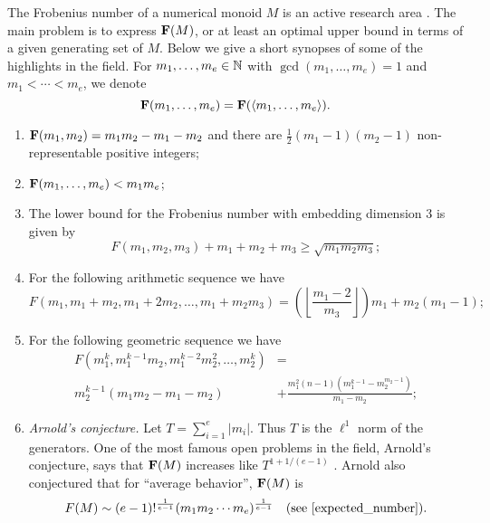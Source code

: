 The Frobenius number of a numerical monoid $M$ is an active research area \cite{Frobenius_book}. The main problem is to express $\mathbf{F}(M)$, or at least an optimal upper bound in terms of a given generating set of $M$. Below we give a short synopses of some of the highlights in the field. For $m_1,\ldots,m_e\in\mathbb N$ with $\gcd(m_1,\ldots,m_e)=1$ and $m_1 < \cdots < m_e$, we denote
$$
\mathbf{F}(m_1,\ldots,m_e)=\mathbf{F}(\langle m_1,\ldots,m_e \rangle).
$$
\begin{enumerate}[label=(\alph*)]
\item $\mathbf{F}(m_1,m_2)=m_1m_2-m_1-m_2$ and there are $\frac{1}{2}(m_1 - 1)(m_2 - 1)$ non-representable positive integers;
\item $\mathbf{F}(m_1,\ldots,m_e)<m_1m_e$;
\item The lower bound for the Frobenius number with embedding dimension 3 is given by \[F(m_1, m_2, m_3) + m_1 + m_2 + m_3 \geq \sqrt{m_1m_2m_3};\]
\item For the following arithmetic sequence we have \[F(m_1, m_1 + m_2, m_1 + 2m_2, \ldots, m_1 + m_2m_3) = \left(\left \lfloor \frac{m_1 - 2}{m_3} \right \rfloor \right)m_1 + m_2(m_1 - 1);\]
\item For the following geometric sequence we have
\begin{align*}
F(m_1^k, m_1^{k-1}m_2, m_1^{k-2}m_2^2, \ldots, m_2^k) &= \\
m_2^{k-1} (m_1m_2 - m_1 - m_2) &+ \frac{m_1^2(n-1)(m_1^{k-1} - m_2^{m_2-1})}{m_1 - m_2};
\end{align*}
\item \textit{Arnold's conjecture.} Let $T = \sum_{i = 1}^e |m_i|$. Thus $T$ is the $\ell^1$ norm of the generators. One of the most famous open problems in the field, Arnold's conjecture, says that $\mathbf{F}(M)$ increases like $T^{1 + 1/(e - 1)}$ \cite[p. 526]{expected_number}. Arnold also conjectured that for ``average behavior'', $\mathbf{F}(M)$ is
\[
    F(M) \sim (e - 1)!^{\frac{1}{e - 1}}(m_1m_2 \cdots m_e)^{\frac{1}{e - 1}} \quad \text{(see \cite[p. 526]{expected_number})}.
\]
\end{enumerate}